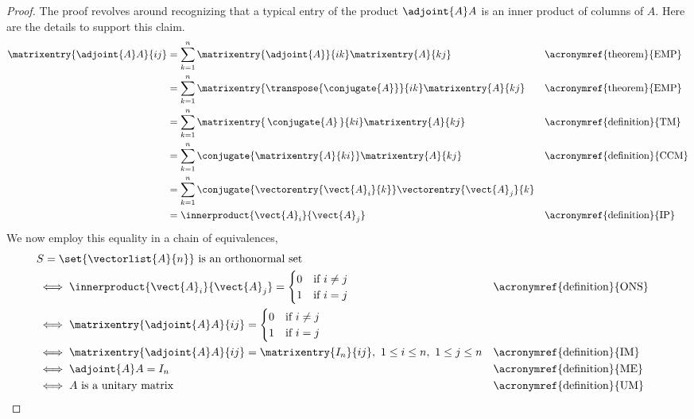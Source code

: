 \begin{proof}
The proof revolves around recognizing that a typical entry of the product $\adjoint{A}A$ is an inner product of columns of $A$.  Here are the details to support this claim.
%
\begin{align*}
\matrixentry{\adjoint{A}A}{ij}
&=\sum_{k=1}^{n}\matrixentry{\adjoint{A}}{ik}\matrixentry{A}{kj}
&&\text{\acronymref{theorem}{EMP}}\\
%
&=\sum_{k=1}^{n}\matrixentry{\transpose{\conjugate{A}}}{ik}\matrixentry{A}{kj}
&&\text{\acronymref{theorem}{EMP}}\\
%
&=\sum_{k=1}^{n}\matrixentry{\,\conjugate{A}\,}{ki}\matrixentry{A}{kj}
&&\text{\acronymref{definition}{TM}}\\
%
&=\sum_{k=1}^{n}\conjugate{\matrixentry{A}{ki}}\matrixentry{A}{kj}
&&\text{\acronymref{definition}{CCM}}\\
%
&=\sum_{k=1}^{n}\conjugate{\vectorentry{\vect{A}_i}{k}}\vectorentry{\vect{A}_j}{k}\\
%
&=\innerproduct{\vect{A}_i}{\vect{A}_j}
&&\text{\acronymref{definition}{IP}}
%
\end{align*}
%
We now employ this equality in a chain of equivalences,
%
\begin{align*}
&\text{$S=\set{\vectorlist{A}{n}}$ is an orthonormal set}\\
&\iff \innerproduct{\vect{A}_i}{\vect{A}_j}=
\begin{cases}
0 &\text{if $i\neq j$}\\
1 & \text{if $i=j$}
\end{cases}&&\text{\acronymref{definition}{ONS}}\\
%
&\iff \matrixentry{\adjoint{A}A}{ij}=
\begin{cases}
0 &\text{if $i\neq j$}\\
1 & \text{if $i=j$}
\end{cases}\\
%
&\iff \matrixentry{\adjoint{A}A}{ij}=\matrixentry{I_n}{ij},\ 1\leq i\leq n,\ 1\leq j\leq n
&&\text{\acronymref{definition}{IM}}\\
%
&\iff \adjoint{A}A=I_n
&&\text{\acronymref{definition}{ME}}\\
%
&\iff \text{$A$ is a unitary matrix}
&&\text{\acronymref{definition}{UM}}
%
\end{align*}
%
\end{proof}
%
%
